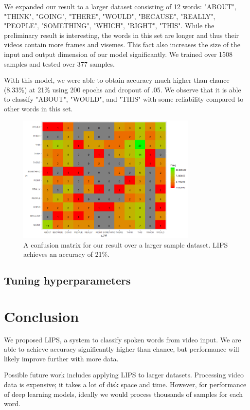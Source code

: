 \documentclass{article}
\begin{document}
We expanded our result to a larger dataset consisting of 12 words: "ABOUT", "THINK", "GOING", "THERE", "WOULD", "BECAUSE", "REALLY", "PEOPLE", "SOMETHING", "WHICH", "RIGHT", "THIS". While the preliminary result is interesting, the words in this set are longer and thus their videos contain more frames and visemes. This fact also increases the size of the input and output dimension of our model significantly. We trained over 1508 samples and tested over 377 samples.

With this model, we were able to obtain accuracy much higher than chance (8.33\%) at 21\% using 200 epochs and dropout of .05. We observe that it is able to classify "ABOUT", "WOULD", and "THIS" with some reliability compared to other words in this set.

   \begin{figure}[h!]
 \centering
  \includegraphics[width=0.8\textwidth]{result2}
 \caption{A confusion matrix for our result over a larger sample dataset. LIPS achieves an accuracy of 21\%.}
 \end{figure}

\subsection{Tuning hyperparameters}

\section{Conclusion}

We proposed LIPS, a system to classify spoken words from video input. We are able to achieve accuracy significantly higher than chance, but performance will likely improve further with more data. 

Possible future work includes applying LIPS to larger datasets. Processing video data is expensive; it takes a lot of disk space and time. However, for performance of deep learning models, ideally we would process thousands of samples for each word.
\end{document}

